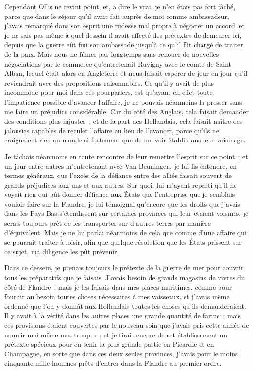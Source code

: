 \documentclass[french,twoside]{book} %
\begin{document}
Cependant Ollis ne revint point, et, à dire le vrai, je n’en étais pas fort fâché, parce que dans le séjour qu’il avait fait auprès de moi comme ambassadeur, j’avais remarqué dans son esprit une rudesse mal propre à négocier un accord, et je ne sais pas même à quel dessein il avait affecté des prétextes de demeurer ici, depuis que la guerre eût fini son ambassade jusqu’à ce qu’il fût chargé de traiter de la paix. Mais nous ne fûmes pas longtemps sans renouer de nouvelles négociations par le commerce qu’entretenait Ruvigny avec le comte de Saint-Alban, lequel était alors en Angleterre et nous faisait espérer de jour en jour qu’il reviendrait avec des propositions raisonnables. Ce qu’il y avait de plus incommode pour moi dans ces pourparlers, est qu’ayant en effet toute l’impatience possible d’avancer l’affaire, je ne pouvais néanmoins la presser sans me faire un préjudice considérable. Car du côté des Anglais, cela faisait demander des conditions plus injustes ; et de la part des Hollandais, cela faisait naître des jalousies capables de reculer l’affaire au lieu de l’avancer, parce qu’ils ne craignaient rien au monde si fortement que de me voir établi dans leur voisinage.\par
Je tâchais néanmoins en toute rencontre de leur remettre l’esprit sur ce point ; et un jour entre autres m’entretenant avec Van Beuningen, je lui fis entendre, en termes généraux, que l’excès de la défiance entre des alliés faisait souvent de grands préjudices aux uns et aux autres. Sur quoi, lui m’ayant reparti qu’il ne voyait rien qui pût donner défiance aux États que l’entreprise que je semblais vouloir faire sur la Flandre, je lui témoignai qu’encore que les droits que j’avais dans les Pays-Bas s’étendissent sur certaines provinces qui leur étaient voisines, je serais toujours prêt de les transporter sur d’autres terres par manière d’équivalent. Mais je ne lui parlai néanmoins de cela que comme d’une affaire qui se pourrait traiter à loisir, afin que quelque résolution que les États prissent sur ce sujet, ma diligence les pût prévenir.\par
Dans ce dessein, je prenais toujours le prétexte de la guerre de mer pour couvrir tous les préparatifs que je faisais. J’avais besoin de grands magasins de vivres du côté de Flandre ; mais je les faisais dans mes places maritimes, comme pour fournir au besoin toutes choses nécessaires à mes vaisseaux, et j’avais même ordonné que l’on y donnât aux Hollandais toutes les choses qu’ils demanderaient. Il y avait à la vérité dans les autres places une grande quantité de farine ; mais ces provisions étaient couvertes par le nouveau soin que j’avais pris cette année de nourrir moi-même mes troupes ; et je tirais encore de cet établissement un prétexte spécieux pour en tenir la plus grande partie en Picardie et en Champagne, en sorte que dans ces deux seules provinces, j’avais pour le moins cinquante mille hommes prêts d’entrer dans la Flandre au premier ordre.\par
\end{document}
